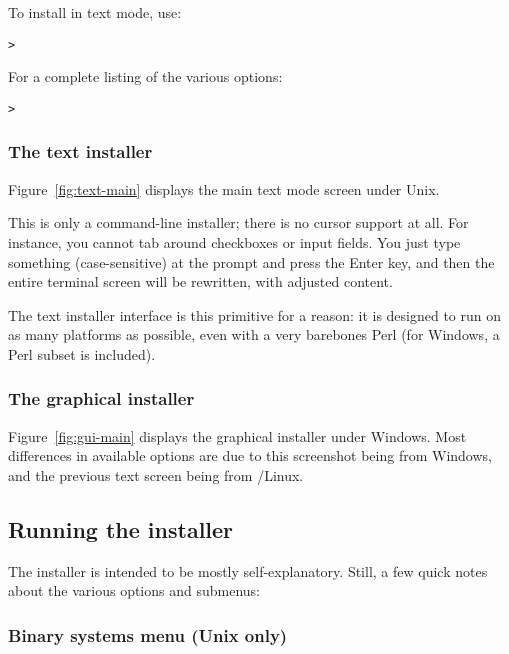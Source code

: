 \documentclass{article}
\begin{document}
To install in text mode, use:
\begin{alltt}
> 
\end{alltt}

For a complete listing of the various options:
\begin{alltt}
> 
\end{alltt}

\subsubsection{The text installer}

Figure~\ref{fig:text-main} displays the main text mode screen under
Unix.

This is only a command-line installer; there is no cursor support at
all.  For instance, you cannot tab around checkboxes or input fields.
You just type something (case-sensitive) at the prompt and press the
Enter key, and then the entire terminal screen will be rewritten, with
adjusted content.

The text installer interface is this primitive for a reason: it
is designed to run on as many platforms as possible, even with a
very barebones Perl (for Windows, a Perl subset is included).

\subsubsection{The graphical installer}

Figure~\ref{fig:gui-main} displays the graphical installer under
Windows.  Most differences in available options are due to this
screenshot being from Windows, and the previous text screen being
from \GNU/Linux.

\subsection{Running the installer}
\label{sec:runinstall}

The installer is intended to be mostly self-explanatory. Still, a few
quick notes about the various options and submenus:

\subsubsection{Binary systems menu (Unix only)}
\label{sec:binary}
\end{document}
